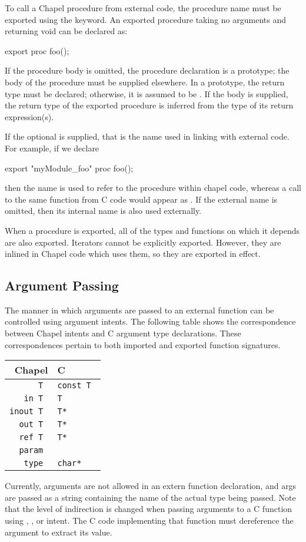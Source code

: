 To call a Chapel procedure from external code, the procedure name must be
exported using the  keyword.  An exported procedure taking no
arguments and returning void can be declared as:
\begin{chapel}
export proc foo();
\end{chapel}
If the procedure body is omitted, the procedure declaration is a prototype; the
body of the procedure must be supplied elsewhere.  In a prototype, the return
type must be declared; otherwise, it is assumed to be .  If the body
is supplied, the return type of the exported procedure is inferred from the
type of its return expression(s).

If the optional  is supplied, that is the name used in
linking with external code.  For example, if we declare
\begin{chapel}
export "myModule_foo" proc foo();
\end{chapel}
\noindent
then the name  is used to refer to the procedure within chapel code,
whereas a call to the same function from C code would appear
as .  If the external name is omitted, then its internal
name is also used externally.

When a procedure is exported, all of the types and functions on which it depends
are also exported.  Iterators cannot be explicitly exported.  However, they are
inlined in Chapel code which uses them, so they are exported in effect.

\subsection{Argument Passing}
\label{Interop_Argument_Passing}

The manner in which arguments are passed to an external function can be
controlled using argument intents.  The following table shows the correspondence
between Chapel intents and C argument type declarations.  These correspondences
pertain to both imported and exported function signatures.

\begin{tabular}{rl}
Chapel & C \\
\hline
\tt T & \tt const T \\
\tt in T & \tt T \\
\tt inout T & \tt T* \\
\tt out T & \tt T* \\
\tt ref T & \tt T* \\
\tt param & \tt \\
\tt type & \tt char*\\
\end{tabular}

Currently,  arguments are not allowed in an extern function
declaration, and  args are passed as a string containing the name of
the actual type being passed.  Note that the level of indirection is changed
when passing arguments to a C function using , ,
or  intent.  The C code implementing that function must dereference
the argument to extract its value.
